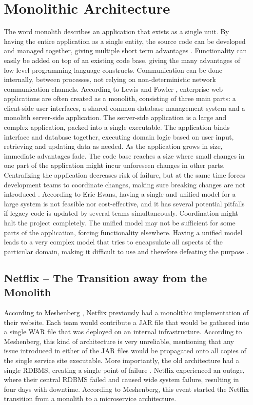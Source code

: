\section{Monolithic Architecture}
The word monolith describes an application that exists as a single unit. By having the entire application as a single entity, the source code can be developed and managed together, giving multiple short term advantages \cite[p.~68]{long2017cloud}. Functionality can easily be added on top of an existing code base, giving the many advantages of low level programming language constructs. Communication can be done internally, between processes, not relying on non-deterministic network communication channels. 
According to Lewis and Fowler \cite{fowler2014microservices}, enterprise web applications are often created as a monolith, consisting of three main parts: a client-side user interfaces, a shared common database management system and a monolith server-side application. The server-side application is a large and complex application, packed into a single executable. The application binds interface and database together, executing domain logic based on user input, retrieving and updating data as needed.
As the application grows in size, immediate advantages fade. The code base reaches a size where small changes in one part of the application might incur unforeseen changes in other parts. Centralizing the application decreases risk of failure, but at the same time forces development teams to coordinate changes, making sure breaking changes are not introduced \cite[p.~68]{long2017cloud}. 
According to Eric Evans, having a single and unified model for a large system is not feasible nor cost-effective, and it has several potential pitfalls if legacy code is updated by several teams simultaneously. Coordination might halt the project completely. The unified model may not be sufficient for some parts of the application, forcing functionality elsewhere. Having a unified model leads to a very complex model that tries to encapsulate all aspects of the particular domain, making it difficult to use and therefore defeating the purpose \cite[p.~331]{evans2004domain}.

\subsection{Netflix -- The Transition away from the Monolith}
According to Meshenberg \cite{meshenberg2016microservices}, Netflix previously had a monolithic implementation of their website. Each team would contribute a JAR file that would be gathered into a single WAR file that was deployed on an internal infrastructure. According to Meshenberg, this kind of architecture is very unreliable, mentioning that any issue introduced in either of the JAR files would be propagated onto all copies of the single service site executable. More importantly, the old architecture had a single RDBMS, creating a single point of failure \cite{meshenberg2016microservices}. Netflix experienced an outage, where their central RDBMS failed and caused wide system failure, resulting in four days with downtime. According to Meshenberg, this event started the Netflix transition from a monolith to a microservice architecture.


